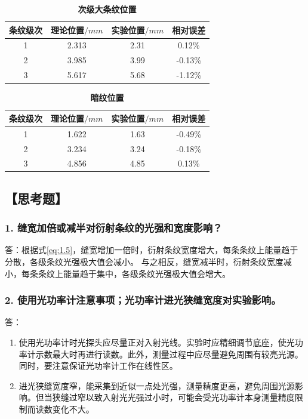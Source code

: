\documentclass[12pt,a4paper,UTF8]{ctexart}
\begin{document}
\begin{table}[htbp]
	\centering
		\begin{tabular}{cccc}
			\toprule
			条纹级次	&理论位置$/mm$	&实验位置$/mm$	&相对误差 \\
			\midrule
			1  &2.313  &2.31  &0.12\% \\
			2  &3.985  &3.99  &-0.13\% \\
			3  &5.617  &5.68  &-1.12\% \\	
			\bottomrule
		\end{tabular}
		\caption{\textbf{次级大条纹位置}}
		\label{tab:3.2}
\end{table}
\begin{table}[htbp]
	\centering
		\begin{tabular}{cccc}
			\toprule
			条纹级次	&理论位置$/mm$	&实验位置$/mm$	&相对误差 \\
			\midrule
			1  &1.622  &1.63  &-0.49\% \\
			2  &3.234  &3.24   &-0.18\% \\
			3  &4.856  &4.85   &0.13\% \\	
			\bottomrule
		\end{tabular}
		\caption{\textbf{暗纹位置}}
		\label{tab:3.3}
\end{table}

\newpage
\subsection*{【思考题】}
\subsubsection*{1. 缝宽加倍或减半对衍射条纹的光强和宽度影响？}
答：根据式\ref{eq:1.5}，缝宽增加一倍时，衍射条纹宽度增大，每条条纹上能量趋于分散，各级条纹光强极大值会减小。
与之相反，缝宽减半时，衍射条纹宽度减小，每条条纹上能量趋于集中，各级条纹光强极大值会增大。
\subsubsection*{2. 使用光功率计注意事项；光功率计进光狭缝宽度对实验影响。}
答：
\begin{enumerate}[label=\arabic*.]
	\item 使用光功率计时光探头应尽量正对入射光线。实验时应精细调节底座，使光功率计示数最大时再进行读数。此外，测量过程中应尽量避免周围有较亮光源。同时，要注意保证光功率计工作在线性区。	
	\item 进光狭缝宽度窄，能采集到近似一点处光强，测量精度更高，避免周围光源影响。但当狭缝过窄以致入射光光强过小时，可能会受光功率计本身测量精度限制而读数变化不大。
\end{enumerate}
\end{document}
